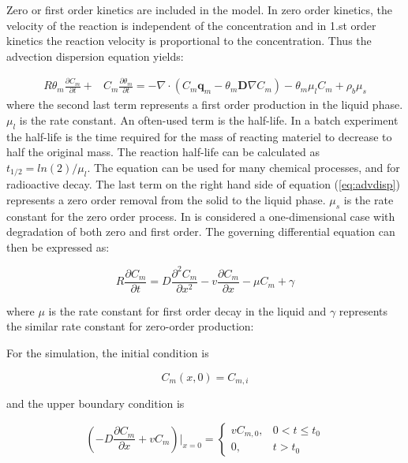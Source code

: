 \documentclass{report}
\begin{document}
Zero or first order kinetics are included in the model. In zero order
kinetics, the velocity of the reaction is
independent of the concentration and in 1.st order
kinetics the reaction velocity is
proportional to the concentration. Thus the advection dispersion
equation yields:

\begin{equation}
\begin{split}
 R\theta_{m} \frac{\partial C_{m}}{\partial t} +& C_{m} \frac{\partial
  \theta_{m}}{\partial t} =  -\nabla \cdot(C_{m}
  \mathbf{q}_{m}-\theta_{m} \mathbf{D}\nabla C_{m})- \theta_{m} \mu_l C_{m} +
  \rho_b \mu_s
\label{eq:advdisp}
\end{split}
\end{equation}
%
where the second last term represents a first order production in
the liquid phase.  $\mu_l$ is the rate constant. An often-used term
is the half-life. In a batch experiment
the half-life is the time required for the mass of reacting materiel to
decrease to half the original mass. The reaction half-life can be
calculated as $t_{1/2}=ln(2)/\mu_l$. The equation can be used for
many chemical processes, and for radioactive
decay. The last term on the right hand
side of equation (\ref{eq:advdisp}) represents a zero order
removal from the solid to the liquid phase. $\mu_s$ is the rate
constant for the zero order process. In \cite{Genuchtenanalytical}
is considered a one-dimensional case with degradation of both zero
and first order. The governing differential equation can then be
expressed as:

\begin{equation}
R\frac{\partial C_m}{\partial t}=D\frac{\partial^2C_m}{\partial
  x^2}-v\frac{\partial C_m}{\partial x}-\mu C_m +\gamma
\end{equation}

where $\mu$ is the rate constant for first order decay in the liquid
and $\gamma$ represents the similar rate constant for zero-order
production:

For the simulation, the initial condition is

\begin{equation}
C_m(x,0)=C_{m,i}
\end{equation}

and the upper boundary condition is

\begin{equation}
\left(-D\frac{\partial C_m}{\partial
x}+vC_m\right)\bigg\vert_{x=0}=\begin{cases} vC_{m,0}, &
  0<t\leq t_0 \\ 0, & t>t_0 \end{cases}
\end{equation}
\end{document}
